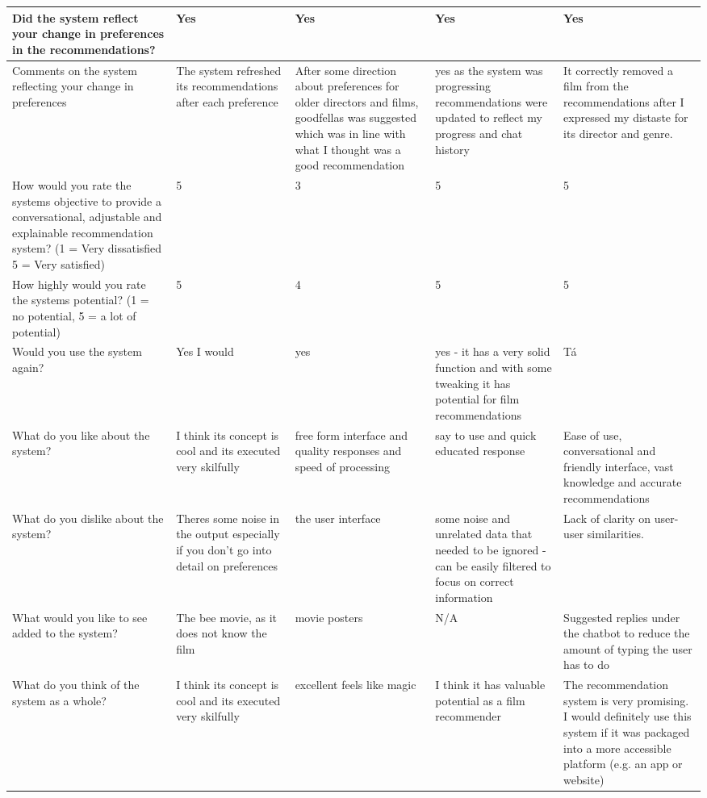 \begin{longtable}{|p{4cm}|p{3cm}|p{3cm}|p{3cm}|p{3cm}|}
\hline
Did the system reflect your change in preferences in the recommendations? & Yes & Yes & Yes & Yes \\
\hline
Comments on the system reflecting your change in preferences & The system refreshed its recommendations after each preference & After some direction about preferences for older directors and films, goodfellas was suggested which was in line with what I thought was a good recommendation & yes as the system was progressing recommendations were updated to reflect my progress and chat history & It correctly removed a film from the recommendations after I expressed my distaste for its director and genre.  \\
\hline
How would you rate the systems objective to provide a conversational, adjustable and explainable recommendation system? (1 = Very dissatisfied   5 = Very satisfied)  & 5 & 3 & 5 & 5 \\
\hline
How highly would you rate the systems potential? (1 = no potential, 5 = a lot of potential) & 5 & 4 & 5 & 5 \\
\hline
Would you use the system again? & Yes I would  & yes & yes - it has a very solid function and with some tweaking it has potential for film recommendations & Tá \\
\hline
What do you like about the system? & I think its concept is cool and its executed very skilfully & free form interface and quality responses and speed of processing & say to use and quick educated response  & Ease of use, conversational and friendly interface, vast knowledge and accurate recommendations \\
\hline
What do you dislike about the system? & Theres some noise in the output especially if you don't go into detail on preferences & the user interface & some noise and unrelated data that needed to be ignored - can be easily filtered to focus on correct information  & Lack of clarity on user-user similarities. \\
\hline
What would you like to see added to the system? & The bee movie, as it does not know the film & movie posters  & N/A & Suggested replies under the chatbot to reduce the amount of typing the user has to do \\
\hline
What do you think of the system as a whole? & I think its concept is cool and its executed very skilfully & excellent feels like magic & I think it has valuable potential as a film recommender & The recommendation system is very promising. I would definitely use this system if it was packaged into a more accessible platform (e.g. an app or website) \\
\hline
\end{longtable}
\label{tab:survey_results}